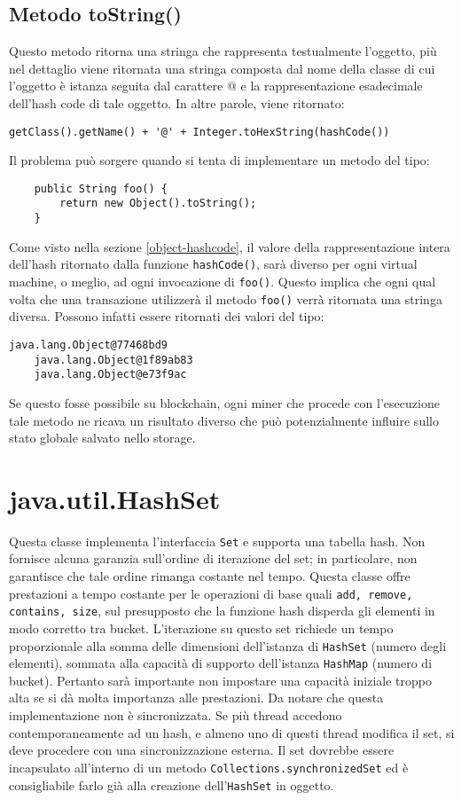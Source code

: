 		\subsection{Metodo toString()}
			Questo metodo ritorna una stringa che rappresenta testualmente l'oggetto, più nel dettaglio viene ritornata una stringa composta dal nome della classe di cui l'oggetto è istanza seguita dal carattere @ e la rappresentazione esadecimale dell'hash code di tale oggetto. In altre parole, viene ritornato:
			\begin{lstlisting}[numbers=none,frame=none]
	getClass().getName() + '@' + Integer.toHexString(hashCode())
				\end{lstlisting}
			Il problema può sorgere quando si tenta di implementare un metodo del tipo:
			\begin{lstlisting}
	public String foo() {
		return new Object().toString();
	}
			\end{lstlisting}
			Come visto nella sezione \ref{object-hashcode}, il valore della rappresentazione intera dell'hash ritornato dalla funzione \lstinline|hashCode()|, sarà diverso per ogni virtual machine, o meglio, ad ogni invocazione di \lstinline|foo()|. Questo implica che ogni qual volta che una transazione utilizzerà il metodo \lstinline|foo()| verrà ritornata una stringa diversa. Possono infatti essere ritornati dei valori del tipo:
			\begin{lstlisting}[numbers=none,frame=none]
	java.lang.Object@77468bd9
	java.lang.Object@1f89ab83
	java.lang.Object@e73f9ac
			\end{lstlisting}
			Se questo fosse possibile su blockchain, ogni miner che procede con l'esecuzione tale metodo ne ricava un risultato diverso che può potenzialmente influire sullo stato globale salvato nello storage.
	
		
	\section{java.util.HashSet}
		Questa classe implementa l'interfaccia \lstinline|Set| e supporta una tabella hash. Non fornisce alcuna garanzia sull'ordine di iterazione del set; in particolare, non garantisce che tale ordine rimanga costante nel tempo. Questa classe offre prestazioni a tempo costante per le operazioni di base quali \lstinline|add, remove, contains, size|, sul presupposto che la funzione hash disperda gli elementi in modo corretto tra bucket. L'iterazione su questo set richiede un tempo proporzionale alla somma delle dimensioni dell'istanza di \lstinline|HashSet| (numero degli elementi), sommata alla capacità di supporto dell'istanza \lstinline|HashMap| (numero di bucket). Pertanto sarà importante non impostare una capacità iniziale troppo alta se si dà molta importanza alle prestazioni. Da notare che questa implementazione non è sincronizzata. Se più thread accedono contemporaneamente ad un hash, e almeno uno di questi thread modifica il set, si deve procedere con una sincronizzazione esterna. Il set dovrebbe essere incapsulato all'interno di un metodo \lstinline|Collections.synchronizedSet| ed è consigliabile farlo già alla creazione dell'\lstinline|HashSet| in oggetto.
		

